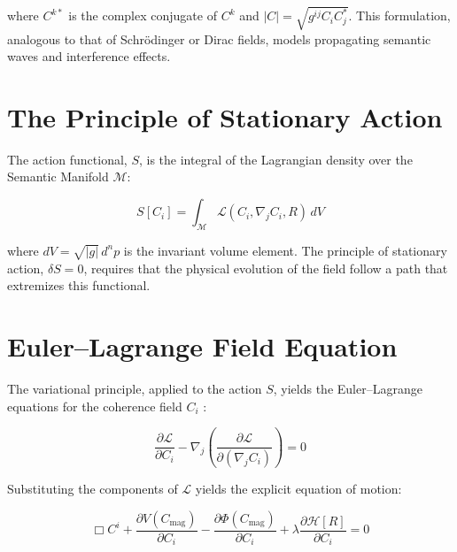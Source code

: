where \(C^{k*}\) is the complex conjugate of \(C^k\) and \(|C| = \sqrt{g^{ij} C_i C_j^*}\). This formulation, analogous to that of Schrödinger or Dirac fields, models propagating semantic waves and interference effects.


\section{The Principle of Stationary Action}
\label{6.3:the_principle_of_stationary_action}

The action functional, \(S\), is the integral of the Lagrangian density over the Semantic Manifold \(\mathcal{M}\):

\begin{equation}
S[C_i] = \int_{\mathcal{M}} \mathcal{L}(C_i, \nabla_j C_i, R) \, dV
\end{equation}

where \(dV = \sqrt{|g|} \, d^n p\) is the invariant volume element. The principle of stationary action, \(\delta S = 0\), requires that the physical evolution of the field follow a path that extremizes this functional.


\section{Euler–Lagrange Field Equation}
\label{6.4:euler_lagrange_field_equation}

The variational principle, applied to the action \(S\), yields the Euler–Lagrange equations for the coherence field \(C_i\) \autocite{Euler1744, Lagrange1788}:

\begin{equation}
\frac{\partial \mathcal{L}}{\partial C_i} - \nabla_j \left( \frac{\partial \mathcal{L}}{\partial (\nabla_j C_i)} \right) = 0
\end{equation}

Substituting the components of \(\mathcal{L}\) yields the explicit equation of motion:

\begin{equation}
\Box C^i + \frac{\partial V(C_{\mathrm{mag}})}{\partial C_i} - \frac{\partial \Phi(C_{\mathrm{mag}})}{\partial C_i} + \lambda \frac{\partial \mathcal{H}[R]}{\partial C_i} = 0
\end{equation}

